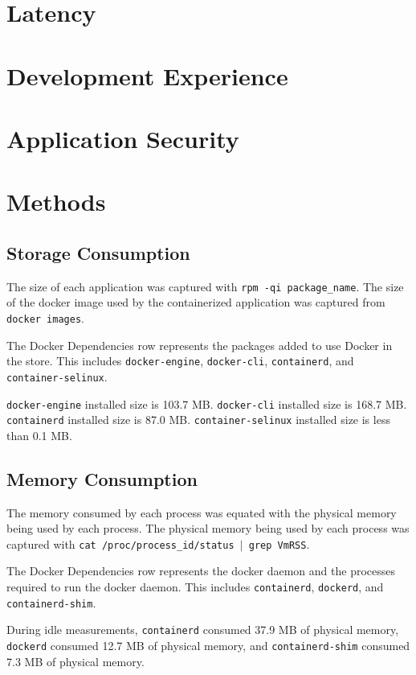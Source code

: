 \documentclass{article}
\begin{document}
\section{Latency}

\section{Development Experience}

\section{Application Security}

\section{Methods}
\subsection{Storage Consumption}
The size of each application was captured with \texttt{rpm -qi package\_name}. The size of the docker image used by the containerized application was captured from \texttt{docker images}.

The Docker Dependencies row represents the packages added to use Docker in the store. This includes \texttt{docker-engine}, \texttt{docker-cli}, \texttt{containerd}, and \texttt{container-selinux}.

\texttt{docker-engine} installed size is 103.7 MB. \texttt{docker-cli} installed size is 168.7 MB. \texttt{containerd} installed size is 87.0 MB. \texttt{container-selinux} installed size is less than 0.1 MB.

\subsection{Memory Consumption}
The memory consumed by each process was equated with the physical memory being used by each process. The physical memory being used by each process was captured with \texttt{cat /proc/process\_id/status $|$ grep VmRSS}.

The Docker Dependencies row represents the docker daemon and the processes required to run the docker daemon. This includes \texttt{containerd}, \texttt{dockerd}, and \texttt{containerd-shim}.

During idle measurements, \texttt{containerd} consumed 37.9 MB of physical memory, \texttt{dockerd} consumed 12.7 MB of physical memory, and \texttt{containerd-shim} consumed 7.3 MB of physical memory.
\end{document}
